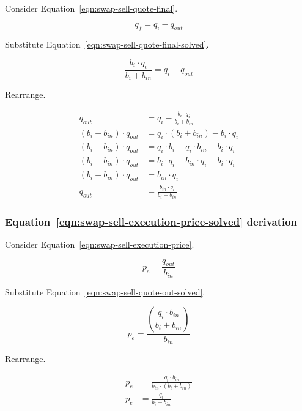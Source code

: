 \documentclass[table, twocolumn]{article}
\begin{document}
Consider Equation~\ref{eqn:swap-sell-quote-final}.

\begin{equation}
	q_f = q_i - q_{out} \nonumber
\end{equation}

Substitute Equation~\ref{eqn:swap-sell-quote-final-solved}.

\begin{equation}
	\frac{b_i \cdot q_i}{b_i + b_{in}}= q_i - q_{out} \nonumber
\end{equation}

Rearrange.

\begin{align}
	q_{out}                      & = q_i - \frac{b_i \cdot q_i}{b_i + b_{in}} \nonumber \\
	(b_i + b_{in}) \cdot q_{out} & = q_i \cdot (b_i + b_{in}) - b_i \cdot q_i \nonumber \\
	(b_i + b_{in}) \cdot q_{out} & =
	q_i \cdot b_i + q_i \cdot b_{in} - b_i \cdot q_i \nonumber                          \\
	(b_i + b_{in}) \cdot q_{out} & =
	b_i \cdot q_i + b_{in} \cdot q_i - b_i \cdot q_i \nonumber                          \\
	(b_i + b_{in}) \cdot q_{out} & = b_{in} \cdot q_i \nonumber                         \\
	q_{out}                      & = \frac{b_{in} \cdot q_i}{b_i + b_{in}} \nonumber
\end{align}

\subsubsection{Equation~\ref{eqn:swap-sell-execution-price-solved} derivation}%
\label{sssec:equation-eqn-swap-sell-execution-price-solved-derivation}

Consider Equation~\ref{eqn:swap-sell-execution-price}.

\begin{equation}
	p_e = \frac{q_{out}}{b_{in}} \nonumber
\end{equation}

Substitute Equation~\ref{eqn:swap-sell-quote-out-solved}.

\begin{equation}
	p_e = \dfrac{\left(\dfrac{q_i \cdot b_{in}}{b_i + b_{in}}\right)}{b_{in}} \nonumber
\end{equation}

Rearrange.

\begin{align}
	p_e & = \frac{q_i \cdot b_{in}}{b_{in} \cdot (b_i + b_{in})} \nonumber \\
	p_e & = \frac{q_i}{b_i + b_{in}} \nonumber
\end{align}
\end{document}
